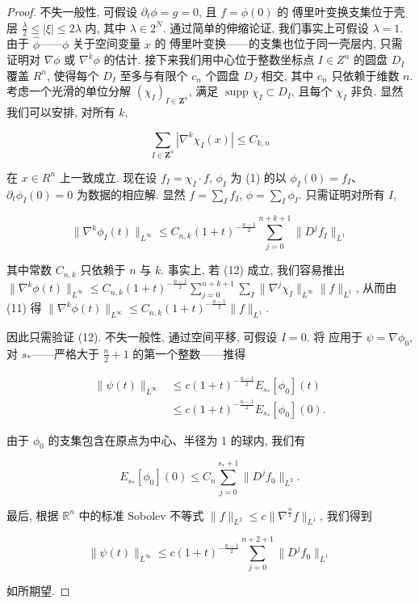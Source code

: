 \begin{proof}
不失一般性, 可假设 $\partial_{t}\phi = g = 0$, 且 $f = \phi(0)$ 的 傅里叶变换支集位于壳层 $\frac{\lambda}{2} \leq |\xi| \leq 2\lambda$ 内, 其中 $\lambda \in 2^{N}$. 通过简单的伸缩论证, 我们事实上可假设 $\lambda = 1$. 由于 $\hat{\phi}$——$\phi$ 关于空间变量 $x$ 的 傅里叶变换——的支集也位于同一壳层内, 只需证明对 $\nabla\phi$ 或 $\nabla^{k}\phi$ 的估计. 接下来我们用中心位于整数坐标点 $I \in Z^n$ 的圆盘 $D_{I}$ 覆盖 $R^{n}$, 使得每个 $D_{I}$ 至多与有限个 $c_{n}$ 个圆盘 $D_{J}$ 相交, 其中 $c_{n}$ 只依赖于维数 $n$. 考虑一个光滑的单位分解 $(\chi_I)_{I \in \mathbf{Z}^n}$, 满足 $\operatorname{supp} \chi_I \subset D_I$, 且每个 $\chi_I$ 非负. 显然我们可以安排, 对所有 $k$, 

\begin{equation}
\sum_ {I \in \mathbf {Z} ^ {n}} | \nabla^ {k} \chi_ {I} (x) | \leq C _ {k,  n}\label{eq:cG-11}
\end{equation}

在 $x \in R^{n}$ 上一致成立. 现在设 $f_{I} = \chi_{I} \cdot f$, $\phi_{I}$ 为 (1) 的以 $\phi_{I}(0) = f_{I}$、$\partial_{t}\phi_{I}(0) = 0$ 为数据的相应解. 显然 $f = \sum_{I} f_{I}$, $\phi = \sum_{I} \phi_{I}$. 只需证明对所有 $I$, 

\begin{equation}
\| \nabla^ {k} \phi_ {I} (t) \| _ {L ^ {\infty}} \leq C _ {n,  k} (1 + t) ^ {- \frac {n - 1}{2}} \sum_ {j = 0} ^ {n + k + 1} \| D ^ {j} f _ {I} \| _ {L ^ {1}}\label{eq:cG-12}
\end{equation}

其中常数 $C_{n, k}$ 只依赖于 $n$ 与 $k$. 事实上, 若 (12) 成立, 我们容易推出 $\| \nabla^k\phi (t)\|_{L^\infty}\leq C_{n, k}(1 + t)^{-\frac{n - 1}{2}}\sum_{j = 0}^{n + k + 1}\sum_{I}\| \nabla^j\chi_I\|_{L^\infty}\| f\|_{L^1}$, 从而由 (11) 得 $\| \nabla^k\phi (t)\|_{L^\infty}\leq C_{n, k}(1 + t)^{-\frac{n - 1}{2}}\| f\|_{L^1}$. 

因此只需验证 (12). 不失一般性, 通过空间平移, 可假设 $I = 0$. 将 应用于 $\psi = \nabla \phi_{0}$, 对 $s_{*}$——严格大于 $\frac{n}{2} + 1$ 的第一个整数——推得

\[
\begin{aligned}
\| \psi (t) \| _ {L ^ {\infty}} &\leq c (1 + t) ^ {- \frac {n - 1}{2}} E _ {s _ {*}} [ \phi_ {0} ] (t) \\
&\leq c (1 + t) ^ {- \frac {n - 1}{2}} E _ {s _ {*}} [ \phi_ {0} ] (0).
\end{aligned}
\]

由于 $\phi_0$ 的支集包含在原点为中心、半径为 1 的球内, 我们有

\[
E _ {s _ {*}} [ \phi_ {0} ] (0) \leq C _ {n} \sum_ {j = 0} ^ {s _ {*} + 1} \| D ^ {j} f _ {0} \| _ {L ^ {2}}.
\]

最后, 根据 $\mathbb{R}^n$ 中的标准 Sobolev 不等式 $\| f\|_{L^2}\leq c\| \nabla^{\frac{n}{2}}f\|_{L^1}$, 我们得到

\[
\| \psi (t) \| _ {L ^ {\infty}} \leq c (1 + t) ^ {- \frac {n - 1}{2}} \sum_ {j = 0} ^ {n + 2 + 1} \| D ^ {j} f _ {0} \| _ {L ^ {1}}
\]

如所期望. 
\end{proof}

